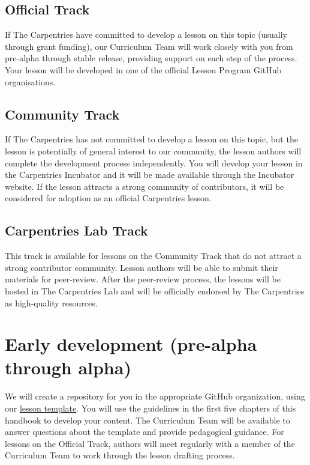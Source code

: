 \documentclass[
]{book}
\begin{document}
\hypertarget{official-track}{%
\subsection{Official Track}\label{official-track}}

If The Carpentries have committed to develop a lesson
on this topic (usually through grant funding), our
Curriculum Team will work closely with you from
pre-alpha through stable release, providing support on
each step of the process. Your lesson will be
developed in one of the official Lesson Program GitHub
organisations.

\hypertarget{community-track}{%
\subsection{Community Track}\label{community-track}}

If The Carpentries has not committed to develop a
lesson on this topic, but the lesson is potentially of
general interest to our community, the lesson authors
will complete the development process independently.
You will develop
your lesson in the Carpentries Incubator and it will be
made available through the Incubator
website. If the lesson attracts a strong community
of contributors, it will be considered for adoption
as an official Carpentries lesson.

\hypertarget{carpentries-lab-track}{%
\subsection{Carpentries Lab Track}\label{carpentries-lab-track}}

This track is available for lessons on the Community
Track that do not attract a strong contributor
community. Lesson authors will be able to submit their
materials for peer-review. After the peer-review
process, the lessons will be hosted in The Carpentries
Lab and will be officially endorsed by The Carpentries
as high-quality resources.

\hypertarget{early-development-pre-alpha-through-alpha}{%
\section{Early development (pre-alpha through alpha)}\label{early-development-pre-alpha-through-alpha}}

We will create a repository for you in the appropriate
GitHub organization, using our
\href{https://github.com/carpentries/styles}{lesson template}. You will use the
guidelines in the first five chapters of this handbook
to develop your content. The Curriculum Team will
be available to answer questions about the template
and provide pedagogical guidance. For lessons on the
Official Track, authors will meet regularly with
a member of the Curriculum Team to work through the
lesson drafting process.
\end{document}
